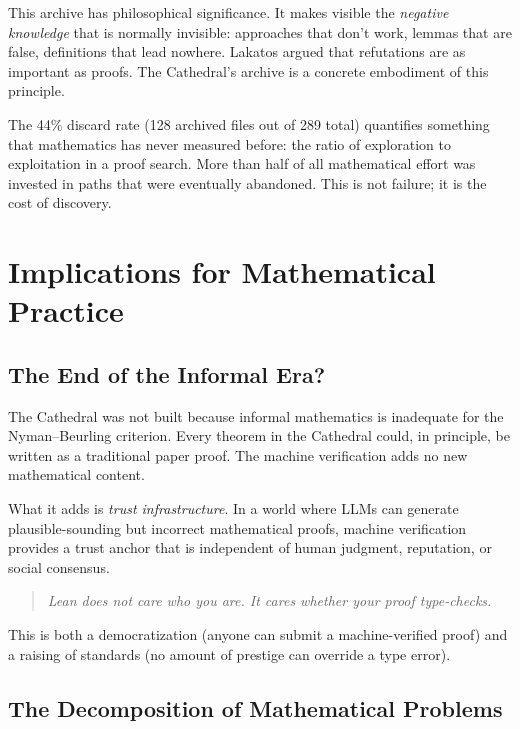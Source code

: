 \documentclass[11pt,a4paper]{article}
\begin{document}
This archive has philosophical significance. It makes visible the
\emph{negative knowledge} that is normally invisible: approaches that
don't work, lemmas that are false, definitions that lead nowhere.
Lakatos argued that refutations are as important as proofs. The
Cathedral's archive is a concrete embodiment of this principle.

The 44\% discard rate (128 archived files out of 289 total) quantifies
something that mathematics has never measured before: the ratio of
exploration to exploitation in a proof search. More than half of all
mathematical effort was invested in paths that were eventually
abandoned. This is not failure; it is the cost of discovery.

\section{Implications for Mathematical Practice}
\label{sec:practice}

\subsection{The End of the Informal Era?}

The Cathedral was not built because informal mathematics is inadequate
for the Nyman--Beurling criterion. Every theorem in the Cathedral
could, in principle, be written as a traditional paper proof. The
machine verification adds no new mathematical content.

What it adds is \emph{trust infrastructure}. In a world where
LLMs can generate plausible-sounding but incorrect mathematical
proofs, machine verification provides a trust anchor that is
independent of human judgment, reputation, or social consensus.

\begin{quote}
\emph{Lean does not care who you are. It cares whether your proof
type-checks.}
\end{quote}

This is both a democratization (anyone can submit a machine-verified
proof) and a raising of standards (no amount of prestige can override
a type error).

\subsection{The Decomposition of Mathematical Problems}
\end{document}

